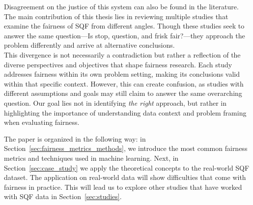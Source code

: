 Disagreement on the justice of this system can also be found in the literature. The main contribution of this thesis lies in reviewing multiple studies that examine the fairness of SQF from different angles. Though these studies seek to answer the same question—Is stop, question, and frisk fair?—they approach the problem differently and arrive at alternative conclusions.\\
This divergence is not necessarily a contradiction but rather a reflection of the diverse perspectives and objectives that shape fairness research. Each study addresses fairness within its own problem setting, making its conclusions valid within that specific context. However, this can create confusion, as studies with different assumptions and goals may still claim to answer the same overarching question. Our goal lies not in identifying \textit{the right} approach, but rather in highlighting the importance of understanding data context and problem framing when evaluating fairness.\par
The paper is organized in the following way: in Section~\ref{sec:fairness_metrics_methods}, we introduce the most common fairness metrics and techniques used in machine learning.
Next, in Section~\ref{sec:case_study} we apply the theoretical concepts to the real-world SQF dataset. 
The application on real-world data will show difficulties that come with fairness in practice.
This will lead us to explore other studies that have worked with SQF data in Section~\ref{sec:studies}. 


